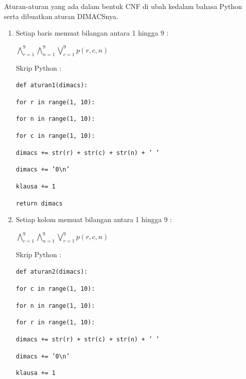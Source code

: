 Aturan-aturan yang ada dalam bentuk CNF di ubah kedalam bahasa Python serta dibuatkan aturan DIMACSnya.

\begin{enumerate}
	\item Setiap baris memuat bilangan antara 1 
	hingga 9 : 
	
	$\bigwedge_{r=1}^{9}$$\bigwedge_{n=1}^{9}$$\bigvee_{c=1}^{9}$$p\left(r,c,n\right)$
	
	\vspace{5mm}
	
	Skrip Python :
	
	\vspace{5mm}
	
	\texttt{def aturan1(dimacs):}
	
	\quad\quad\texttt{for r in range(1, 10):}
	
	\quad\quad\quad\texttt{for n in range(1, 10):}
	
	\quad\quad\quad\quad\texttt{for c in range(1, 10):}
	
	\quad\quad\quad\quad\quad\texttt{dimacs += str(r) + str(c) + str(n) + ' '}
	
	\quad\quad\quad\quad\texttt{dimacs += '0\textbackslash n'}
	
	\quad\quad\quad\quad\texttt{klausa += 1}
	
	\quad\quad\texttt{return dimacs}
	
	
	\item Setiap kolom memuat bilangan antara 1 hingga 9 : 
	
	$\bigwedge_{c=1}^{9}$$\bigwedge_{n=1}^{9}$$\bigvee_{r=1}^{9}$$p\left(r,c,n\right)$
	
	
	\vspace{5mm}
	
	Skrip Python :
	
	\vspace{5mm}
	
	\texttt{def aturan2(dimacs):}
	
	\quad \quad\texttt{for c in range(1, 10):}
	
	\quad \quad \quad\texttt{for n in range(1, 10):}
	
	\quad \quad \quad \quad\texttt{for r in range(1, 10):}
	
	\quad\quad\quad\quad\quad\texttt{dimacs += str(r) + str(c) + str(n) + ' '}
	
	\quad \quad \quad \quad\texttt{dimacs += '0\textbackslash n'}
	
	\quad \quad \quad \quad\texttt{klausa += 1}
	

\end{enumerate}
